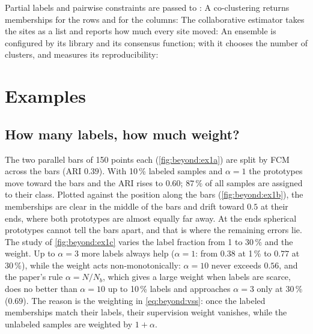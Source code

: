 Partial labels and pairwise constraints are passed to :
A co-clustering returns memberships for the rows and for the columns:
The collaborative estimator takes the sites as a list and reports how much every site moved:
An ensemble is configured by its library and its consensus function; with  it chooses the number of clusters, and  measures its reproducibility:

\section{Examples}\label{sec:beyond:examples}

\subsection{How many labels, how much weight?}

The two parallel bars of 150 points each (\cref{fig:beyond:ex1a}) are split by FCM across the bars (ARI $0.39$). With 10\,\% labeled samples and $\alpha=1$ the prototypes move toward the bars and the ARI rises to $0.60$; $87\,\%$ of all samples are assigned to their class. Plotted against the position along the bars (\cref{fig:beyond:ex1b}), the memberships are clear in the middle of the bars and drift toward $0.5$ at their ends, where both prototypes are almost equally far away. At the ends spherical prototypes cannot tell the bars apart, and that is where the remaining errors lie. The study of \cref{fig:beyond:ex1c} varies the label fraction from 1 to 30\,\% and the weight. Up to $\alpha=3$ more labels always help ($\alpha=1$: from $0.38$ at 1\,\% to $0.77$ at 30\,\%), while the weight acts non-monotonically: $\alpha=10$ never exceeds $0.56$, and the paper's rule $\alpha=N/N_b$, which gives a large weight when labels are scarce, does no better than $\alpha=10$ up to 10\,\% labels and approaches $\alpha=3$ only at 30\,\% ($0.69$). The reason is the weighting in \eqref{eq:beyond:vss}: once the labeled memberships match their labels, their supervision weight vanishes, while the unlabeled samples are weighted by $1+\alpha$.

